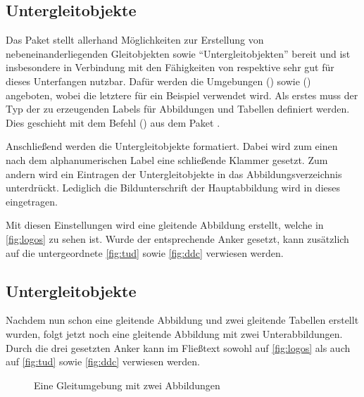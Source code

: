 \documentclass[%
  english,ngerman,%
  cdgeometry=no,DIV=12,automark%
]{tudscrartcl}
\begin{document}
\subsection{Untergleitobjekte}
\label{sec:subfloats}%
%
Das Paket  stellt allerhand Möglichkeiten zur Erstellung von 
nebeneinanderliegenden Gleitobjekten sowie \enquote{Untergleitobjekten} bereit 
und ist insbesondere in Verbindung mit den Fähigkeiten von  
respektive  sehr gut für dieses Unterfangen nutzbar. Dafür 
werden die Umgebungen () sowie 
() angeboten, wobei die letztere für 
ein Beispiel verwendet wird. Als erstes muss der Typ der zu erzeugenden Labels 
für Abbildungen und Tabellen definiert werden. Dies geschieht mit dem Befehl 
() aus dem Paket 
.
%
\begin{Preamble}
\end{Preamble}
%
Anschließend werden die Untergleitobjekte formatiert. Dabei wird zum einen nach 
dem alphanumerischen Label eine schließende Klammer gesetzt. Zum andern wird 
ein Eintragen der Untergleitobjekte in das Abbildungsverzeichnis unterdrückt. 
Lediglich die Bildunterschrift der Hauptabbildung wird in dieses eingetragen.
%
\begin{Preamble*}
\captionsetup[subfloat]{labelformat=brace,list=off}

\end{Preamble*}
%
Mit diesen Einstellungen wird eine gleitende Abbildung erstellt, welche in 
\autoref{fig:logos} zu sehen ist. Wurde der entsprechende Anker gesetzt, kann 
zusätzlich auf die untergeordnete \autoref{fig:tud} sowie \autoref{fig:ddc} 
verwiesen werden.
%
\begin{Trunk+}
\subsection{Untergleitobjekte}
Nachdem nun schon eine gleitende Abbildung und zwei gleitende Tabellen 
erstellt wurden, folgt jetzt noch eine gleitende Abbildung mit zwei 
Unterabbildungen. Durch die drei gesetzten Anker kann im Fließtext 
sowohl auf \autoref{fig:logos} als auch auf \autoref{fig:tud} sowie 
\autoref{fig:ddc} verwiesen werden.

\end{Trunk+}
\begin{Trunk}
\begin{figure}
%
  {\caption{Eine Gleitumgebung mit zwei Abbildungen}\label{fig:logos}}%
\end{figure}

\end{Trunk}
\InputCode
\end{document}
